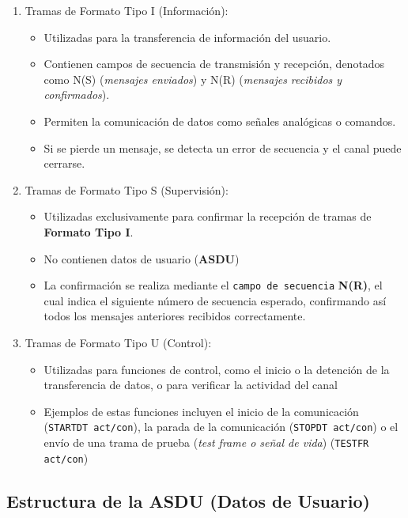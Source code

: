 \documentclass[a5paper]{book}%
\begin{document}
\begin{enumerate}
\item Tramas de Formato Tipo I (Información):
  \begin{itemize}
  \item Utilizadas para la transferencia de información del usuario.
  \item Contienen campos de secuencia de transmisión y recepción, denotados como N(S) (\textit{mensajes enviados}) y N(R) (\textit{mensajes recibidos y confirmados}).
  \item Permiten la comunicación de datos como señales analógicas o comandos.
  \item Si se pierde un mensaje, se detecta un error de secuencia y el canal puede cerrarse.
    \end{itemize}

\item Tramas de Formato Tipo S (Supervisión):
\begin{itemize}
\item Utilizadas exclusivamente para confirmar la recepción de tramas de \textbf{Formato Tipo I}.
\item No contienen datos de usuario (\textbf{ASDU})
\item La confirmación se realiza mediante el \texttt{campo de secuencia} \textbf{N(R)}, el cual indica el siguiente número de secuencia esperado, confirmando así todos los mensajes anteriores recibidos correctamente.
\end{itemize}

\item Tramas de Formato Tipo U (Control):
  \begin{itemize}
  \item Utilizadas para funciones de control, como el inicio o la detención de la transferencia de datos, o para verificar la actividad del canal
  \item Ejemplos de estas funciones incluyen el inicio de la comunicación (\texttt{STARTDT act/con}), la parada de la comunicación (\texttt{STOPDT act/con}) o el envío de una trama de prueba (\textit{test frame o señal de vida}) (\texttt{TESTFR act/con})
  \end{itemize}
  
\end{enumerate}


\subsection{Estructura de la ASDU (Datos de Usuario)}
\end{document}
